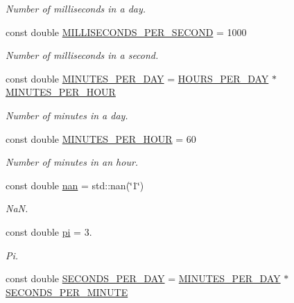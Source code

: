 \begin{DoxyCompactItemize}
\begin{DoxyCompactList}\small\item\em Number of milliseconds in a day. \end{DoxyCompactList}\item 
const double \mbox{\hyperlink{namespace_num_cpp_1_1_constants_af6ba5707b763ac1ff3832e31bedd6241}{M\+I\+L\+L\+I\+S\+E\+C\+O\+N\+D\+S\+\_\+\+P\+E\+R\+\_\+\+S\+E\+C\+O\+ND}} = 1000
\begin{DoxyCompactList}\small\item\em Number of milliseconds in a second. \end{DoxyCompactList}\item 
const double \mbox{\hyperlink{namespace_num_cpp_1_1_constants_a2a63420518585303b8e07dfb3c0eba4a}{M\+I\+N\+U\+T\+E\+S\+\_\+\+P\+E\+R\+\_\+\+D\+AY}} = \mbox{\hyperlink{namespace_num_cpp_1_1_constants_ae310d2531577c64d5fdea2da035cc1cd}{H\+O\+U\+R\+S\+\_\+\+P\+E\+R\+\_\+\+D\+AY}} $\ast$ \mbox{\hyperlink{namespace_num_cpp_1_1_constants_a3043da03b8f81b89353fad8361f40b79}{M\+I\+N\+U\+T\+E\+S\+\_\+\+P\+E\+R\+\_\+\+H\+O\+UR}}
\begin{DoxyCompactList}\small\item\em Number of minutes in a day. \end{DoxyCompactList}\item 
const double \mbox{\hyperlink{namespace_num_cpp_1_1_constants_a3043da03b8f81b89353fad8361f40b79}{M\+I\+N\+U\+T\+E\+S\+\_\+\+P\+E\+R\+\_\+\+H\+O\+UR}} = 60
\begin{DoxyCompactList}\small\item\em Number of minutes in an hour. \end{DoxyCompactList}\item 
const double \mbox{\hyperlink{namespace_num_cpp_1_1_constants_a402fb11b9f335e5f3eb4f7e87689a570}{nan}} = std\+::nan(\char`\"{}1\char`\"{})
\begin{DoxyCompactList}\small\item\em NaN. \end{DoxyCompactList}\item 
const double \mbox{\hyperlink{namespace_num_cpp_1_1_constants_af22b64ad1b8901bb580d2d9877586399}{pi}} = 3.
\begin{DoxyCompactList}\small\item\em Pi. \end{DoxyCompactList}\item 
const double \mbox{\hyperlink{namespace_num_cpp_1_1_constants_aa703dec8b51bafb3c563067d0453db60}{S\+E\+C\+O\+N\+D\+S\+\_\+\+P\+E\+R\+\_\+\+D\+AY}} = \mbox{\hyperlink{namespace_num_cpp_1_1_constants_a2a63420518585303b8e07dfb3c0eba4a}{M\+I\+N\+U\+T\+E\+S\+\_\+\+P\+E\+R\+\_\+\+D\+AY}} $\ast$ \mbox{\hyperlink{namespace_num_cpp_1_1_constants_ab3ee006095e209277bcfeebff5a3d755}{S\+E\+C\+O\+N\+D\+S\+\_\+\+P\+E\+R\+\_\+\+M\+I\+N\+U\+TE}}

\end{DoxyCompactItemize}
